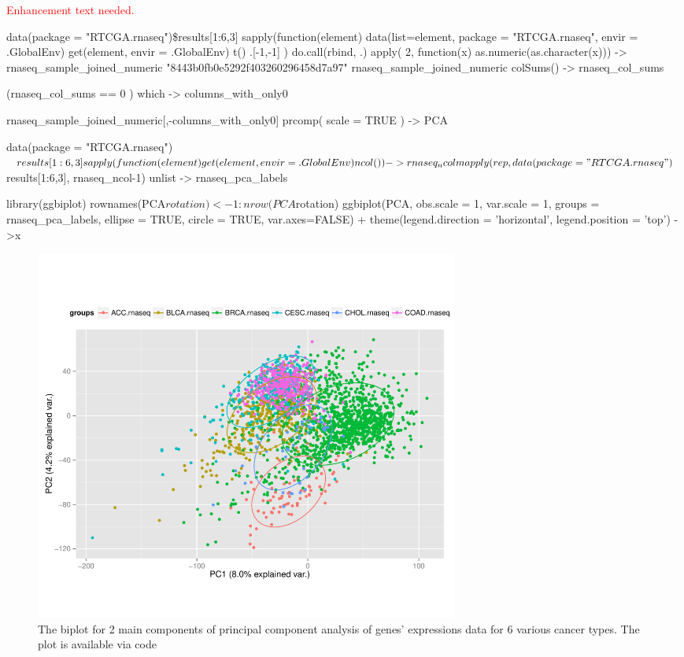\textcolor{red}{Enhancement text needed.}

\begin{Schunk} 
\begin{Sinput}
data(package = "RTCGA.rnaseq")\$results[1:6,3] %
   sapply(function(element){
      data(list=element, 
              package = "RTCGA.rnaseq",
              envir = .GlobalEnv)
      get(element, envir = .GlobalEnv) %
         t() %
         .[-1,-1] 
   }) %
   do.call(rbind, .) %
   apply( 2, function(x) as.numeric(as.character(x))) -> 
   rnaseq_sample_joined_numeric
          "8443b0fb0e5292f403260296458d7a97"
rnaseq_sample_joined_numeric %
   colSums() -> rnaseq_col_sums

(rnaseq_col_sums == 0 ) %
   which -> columns_with_only0

rnaseq_sample_joined_numeric[,-columns_with_only0] %
   prcomp( scale = TRUE ) -> PCA

data(package = "RTCGA.rnaseq")$results[1:6,3] %
   sapply(function(element){
      get(element, envir = .GlobalEnv) %
         ncol() 
   }) -> rnaseq_ncol

mapply(rep, 
       data(package = "RTCGA.rnaseq")$results[1:6,3], 
       rnaseq_ncol-1) %
   unlist -> rnaseq_pca_labels

library(ggbiplot)
rownames(PCA$rotation) <- 1:nrow(PCA$rotation)
ggbiplot(PCA, obs.scale = 1, var.scale = 1,
  groups = rnaseq_pca_labels, ellipse = TRUE, circle = TRUE, var.axes=FALSE) +
  theme(legend.direction = 'horizontal', legend.position = 'top') ->x
\end{Sinput}
\end{Schunk}

\begin{figure}[h!]
\includegraphics[width=14cm]{biplot2.pdf}
\caption{\label{biplot2}The biplot for 2 main components of principal component analysis of genes' expressions data for 6 various cancer types. The plot is available via code }
\end{figure}

